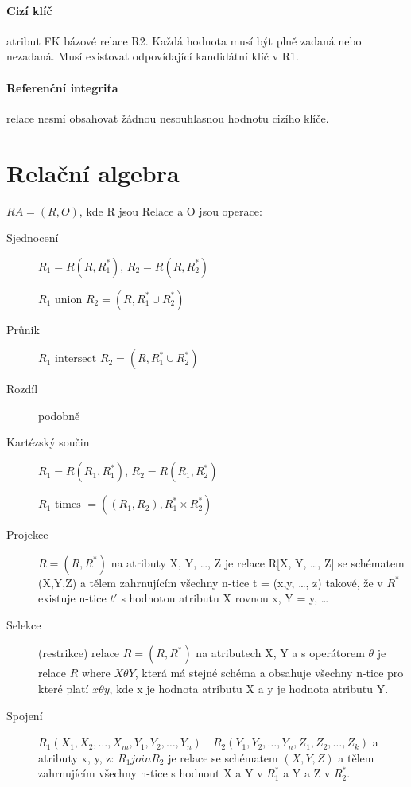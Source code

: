 \documentclass[a4paper, 11pt]{report}
\begin{document}
\paragraph{Cizí klíč} atribut FK bázové relace R2. Každá hodnota musí být plně zadaná nebo nezadaná. Musí existovat odpovídající kandidátní klíč v R1.

\paragraph{Referenční integrita} relace nesmí obsahovat žádnou nesouhlasnou hodnotu cizího klíče.

\section{Relační algebra}
$RA = (R,O)$, kde R jsou Relace a O jsou operace:

\begin{description}
	\item[Sjednocení] $R_1 = R( R, R_1^*)$, $R_2 = R( R, R_2^*)$
	
	$R_1 \text{ union } R_2 = (R, R_1^* \cup R_2^*)$
	
	\item[Průnik] $R_1 \text{ intersect } R_2 = (R, R_1^* \cup R_2^*)$
	\item[Rozdíl] podobně
	\item[Kartézský součin] $R_1 = R( R_1, R_1^*)$, $R_2 = R( R_1, R_2^*)$
	
	$R_1 \text{ times } = ( (R_1, R_2), R_1^* \times R_2^*)$
	
	\item[Projekce] $R = (R, R^*)$ na atributy X, Y, \dots, Z je relace R[X, Y, \dots, Z] se schématem (X,Y,Z) a tělem zahrnujícím všechny n-tice t = (x,y, \dots, z) takové, že v $R^*$ existuje n-tice $t'$ s hodnotou atributu X rovnou x, Y = y, \dots
	\item[Selekce] (restrikce) relace $R = (R, R^*)$ na atributech X, Y a s operátorem $\theta$ je relace $R \text{ where } X \theta Y$, která má stejné schéma a obsahuje všechny n-tice pro které platí $x \theta y$, kde x je hodnota atributu X a y je hodnota atributu Y.
	\item[Spojení] $R_1(X_1, X_2, \dots, X_m, Y_1, Y_2, \dots, Y_n) \quad R_2(Y_1, Y_2, \dots, Y_n, Z_1, Z_2, \dots, Z_k)$ a atributy x, y, z: $R_1 join R_2$ je relace se schématem $(X, Y, Z)$ a tělem zahrnujícím všechny n-tice  s hodnout X a Y v $R_1^*$ a Y a Z v $R_2^*$.
\end{description}
\end{document}
